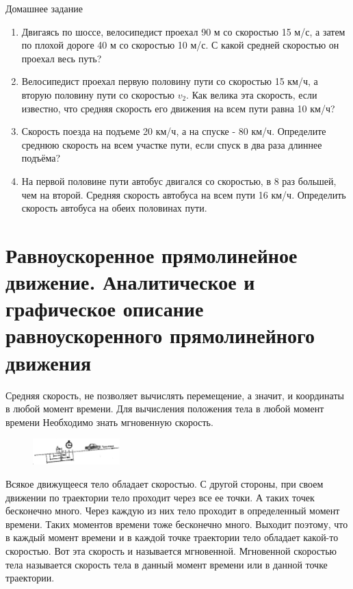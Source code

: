 \documentclass[a5paper, 10pt]{diss_4}
\renewcommand{\'}{\,'}
\begin{document}
\begin{center}
   Домашнее задание
\end{center}
\begin{enumerate}
\item Двигаясь по шоссе, велосипедист проехал 90 м со скоростью 15 м/с, а затем
по плохой дороге 40 м со скоростью 10 м/с. С какой средней скоростью он проехал
весь путь?

\item Велосипедист проехал первую половину пути со скоростью 15 км/ч, а вторую
половину пути со скоростью $v_2$. Как велика эта скорость, если известно, что
средняя скорость его движения на всем пути равна 10 км/ч?

\item Скорость поезда на подъеме 20 км/ч, а на спуске - 80 км/ч. Определите
среднюю скорость на всем участке пути, если спуск в два раза длиннее подъёма?

\item На первой половине пути автобус двигался со скоростью, в 8 раз большей,
чем на второй. Средняя скорость автобуса на всем пути 16 км/ч. Определить
скорость автобуса на обеих половинах пути.
\end{enumerate}

\section{Равноускоренное прямолинейное движение. Аналитическое и графическое
описание равноускоренного прямолинейного движения}

  Средняя скорость, не позволяет вычислять перемещение, а значит, и
координаты в любой момент времени. Для вычисления положения тела в любой момент
времени Необходимо знать мгновенную скорость.

\begin{figure}
\begin{center}
\includegraphics[width=0.3\textwidth]{img/img_10.eps}
\caption{}
\end{center}
\label{fig10}
\end{figure}


  Всякое движущееся тело обладает скоростью. С другой стороны, при своем
движении по траектории тело проходит через все ее точки. А таких точек
бесконечно много. Через каждую из них тело проходит в определенный момент
времени. Таких моментов времени тоже бесконечно много. Выходит поэтому, что в
каждый момент времени и в каждой точке траектории тело обладает какой-то
скоростью. Вот эта скорость и называется мгновенной. Мгновенной скоростью
тела называется скорость тела в данный момент времени или в данной точке
траектории.
\end{document}
